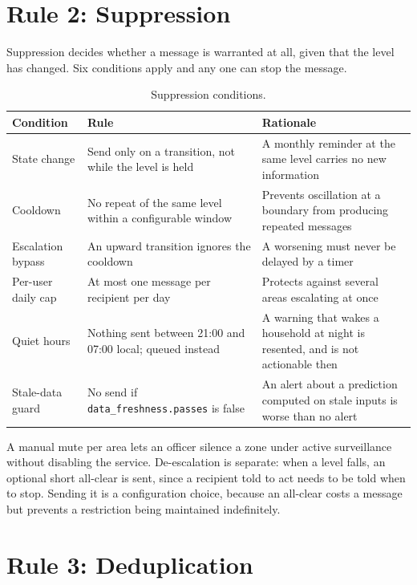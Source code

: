 \documentclass[10pt,openany]{report}
\begin{document}
\section{Rule 2: Suppression}

Suppression decides whether a message is warranted at all, given that the level has changed. Six
conditions apply and any one can stop the message.

\begin{table}[htbp]
\centering
\caption{Suppression conditions.}
\label{tab:suppression}
\small
\begin{tabular}{@{}>{\raggedright\arraybackslash}p{3.0cm}>{\raggedright\arraybackslash}p{5.2cm}>{\raggedright\arraybackslash}p{5.4cm}@{}}
\toprule
\textbf{Condition} & \textbf{Rule} & \textbf{Rationale} \\
\midrule
State change & Send only on a transition, not while the level is held & A monthly reminder at the same level carries no new information \\
Cooldown & No repeat of the same level within a configurable window & Prevents oscillation at a boundary from producing repeated messages \\
Escalation bypass & An upward transition ignores the cooldown & A worsening must never be delayed by a timer \\
Per-user daily cap & At most one message per recipient per day & Protects against several areas escalating at once \\
Quiet hours & Nothing sent between 21:00 and 07:00 local; queued instead & A warning that wakes a household at night is resented, and is not actionable then \\
Stale-data guard & No send if \texttt{data\_freshness.passes} is false & An alert about a prediction computed on stale inputs is worse than no alert \\
\bottomrule
\end{tabular}
\end{table}

A manual mute per area lets an officer silence a zone under active surveillance without disabling the
service. De-escalation is separate: when a level falls, an optional short all-clear is sent, since a
recipient told to act needs to be told when to stop. Sending it is a configuration choice, because an
all-clear costs a message but prevents a restriction being maintained indefinitely.

\section{Rule 3: Deduplication}
\end{document}
